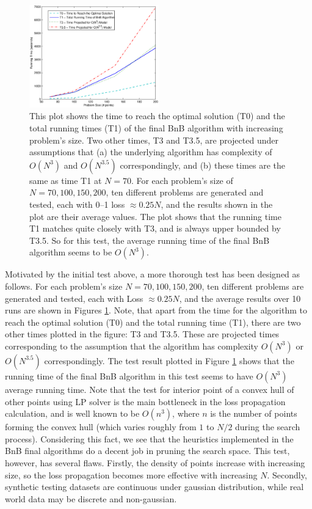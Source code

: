 \begin{figure}[here]
\includegraphics[width=0.50\textwidth]{images/fig34_FinalTimes.eps}
\caption{
This plot shows the time to reach the optimal solution (T0) and the total running times (T1) of the final BnB algorithm with increasing problem's size. Two other times, T3 and T3.5, are projected under assumptions that (a) the underlying algorithm has complexity of $O(N^3)$ and $O(N^{3.5})$ correspondingly, and (b) these times are the same as time T1 at $N=70$. For each problem's size of $N = 70, 100, 150, 200$, ten different problems are generated and tested, each with 0--1 loss $\approx 0.25 N$, and the results shown in the plot are their average values. The plot shows that the running time T1 matches quite closely with T3, and is always upper bounded by T3.5. So for this test, the average running time of the final BnB algorithm seems to be $O(N^3)$.}
\label{fig:FinalTimes}
\end{figure} 

Motivated by the initial test above, a more thorough test has been designed as follows. For each problem's size $N = 70, 100, 150, 200$, ten different problems are generated and tested, each with Loss $\approx 0.25 N$, and the average results over 10 runs are shown in Figures \ref{fig:FinalTimes}. Note, that apart from the time for the algorithm to reach the optimal solution (T0) and the total running time (T1), there are two other times plotted in the figure: T3 and T3.5. These are projected times corresponding to the assumption that the algorithm has complexity $O(N^3)$ or $O(N^{3.5})$ correspondingly. The test result plotted in Figure \ref{fig:FinalTimes} shows that the running time of the final BnB algorithm in this test seems to have $O(N^3)$ average running time. Note that the test for interior point of a convex hull of other points using LP solver is the main bottleneck in the loss propagation calculation, and is well known to be $O(n^3)$, where $n$ is the number of points forming the convex hull (which varies roughly from $1$ to $N/2$ during the search process). Considering this fact, we see that the heuristics implemented in the BnB final algorithms do a decent job in pruning the search space. This test, however, has several flaws. Firstly, the density of points increase with increasing size, so the loss propagation becomes more effective with increasing $N$. Secondly, synthetic testing datasets are continuous under gaussian distribution, while real world data may be discrete and non-gaussian. 


